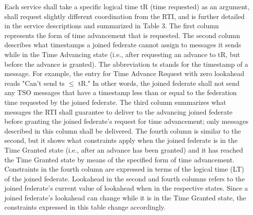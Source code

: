 \begin{compactstdpage}

    Each service shall take a specific logical time tR (time requested) as an argument, shall request slightly different coordination from the RTI, and is further detailed in the service descriptions and summarized in Table 3. The first column represents the form of time advancement that is requested. The second column describes what timestamps a joined federate cannot assign to messages it sends while in the Time Advancing state (i.e., after requesting an advance to tR, but before the advance is granted). The abbreviation ts stands for the timestamp of a message. For example, the entry for Time Advance Request with zero lookahead reads "Can't send ts $\leq$ tR." In other words, the joined federate shall not send any TSO messages that have a timestamp less than or equal to the federation time requested by the joined federate. The third column summarizes what messages the RTI shall guarantee to deliver to the advancing joined federate before granting the joined federate's request for time advancement; only messages described in this column shall be delivered. The fourth column is similar to the second, but it shows what constraints apply when the joined federate is in the Time Granted state (i.e., after an advance has been granted) and it has reached the Time Granted state by means of the specified form of time advancement.\footnotemark[8]
    Constraints in the fourth column are expressed in terms of the logical time (LT) of the joined federate. Lookahead in the second and fourth columns refers to the joined federate's current value of lookahead when in the respective states. Since a joined federate's lookahead can change while it is in the Time Granted state, the constraints expressed in this table change accordingly.


\end{compactstdpage}
